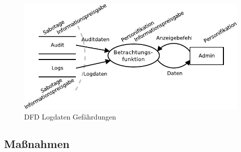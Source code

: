 \documentclass[11pt,a4paper]{report}
\begin{document}
\begin{figure}[htbp]
\centering
\includegraphics[scale=1.2]{images/dfd_logs_threats.pdf}
\caption{DFD Logdaten Gefährdungen}
\label{fig:dfd_logs_threat}
\end{figure}

\subsection{Maßnahmen} \label{sec:mod_measures_log}
\end{document}
